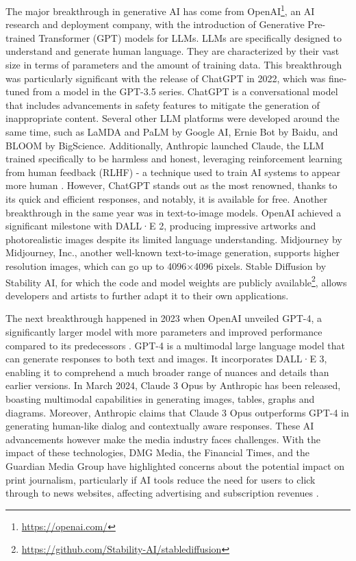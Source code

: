 \documentclass[11pt,a4paper]{article}
\begin{document}
The major breakthrough in generative AI has come from OpenAI\footnote{\url{https://openai.com/}}, an AI research and deployment company, with the introduction of Generative Pre-trained Transformer (GPT) models for LLMs. LLMs are specifically designed to understand and generate human language. They are characterized by their vast size in terms of parameters and the amount of training data. This breakthrough was particularly significant with the release of ChatGPT %
in 2022, which was fine-tuned from a model in the GPT-3.5 series. ChatGPT is a conversational model that includes advancements in safety features to mitigate the generation of inappropriate content. Several other LLM platforms were developed around the same time, such as LaMDA and PaLM by Google AI, Ernie Bot by Baidu, and BLOOM by BigScience. Additionally, Anthropic launched Claude, the LLM trained specifically to be harmless and honest, leveraging reinforcement learning from human feedback (RLHF) - a technique used to train AI systems to appear more human \cite{Bai:Train:2021}. However, ChatGPT stands out as the most renowned, thanks to its quick and efficient responses, and notably, it is available for free. Another breakthrough in the same year was in text-to-image models. OpenAI achieved a significant milestone with DALL·E 2, producing impressive artworks and photorealistic images despite its limited language understanding. Midjourney by Midjourney, Inc., another well-known text-to-image generation, supports higher resolution images, which can go up to 4096$\times$4096 pixels. Stable Diffusion by Stability AI, for which the code and model weights are publicly available\footnote{\url{https://github.com/Stability-AI/stablediffusion}}, allows developers and artists to further adapt it to their own applications.

The next breakthrough happened in 2023 when OpenAI unveiled GPT-4, a significantly larger model with more parameters and improved performance compared to its predecessors \cite{openai:gpt4:2023}. GPT-4 is a multimodal large language model that can generate responses to both text and images. It incorporates DALL·E 3, enabling it to comprehend a much broader range of nuances and details than earlier versions. In March 2024, Claude 3 Opus by Anthropic has been released, boasting multimodal capabilities in generating images, tables, graphs and diagrams. Moreover, Anthropic claims that Claude 3 Opus outperforms GPT-4 in generating human-like dialog and contextually aware responses. These AI advancements however make the media industry faces challenges. With the impact of these technologies, DMG Media, the Financial Times, and the Guardian Media Group have highlighted concerns about the potential impact on print journalism, particularly if AI tools reduce the need for users to click through to news websites, affecting advertising and subscription revenues \cite{UK:Large:2024}.
\end{document}
